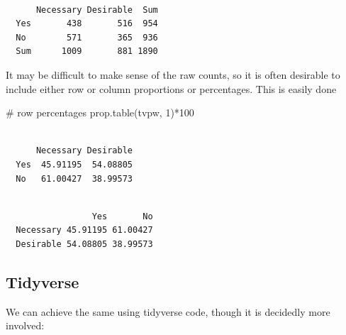 \documentclass[
  letterpaper,
  DIV=11,
  numbers=noendperiod]{scrreprt}
\newenvironment{Shaded}{\begin{snugshade}}{\end{snugshade}}
\newcommand{\CommentTok}[1]{\textcolor[rgb]{0.37,0.37,0.37}{#1}}
\newcommand{\DecValTok}[1]{\textcolor[rgb]{0.68,0.00,0.00}{#1}}
\newcommand{\FunctionTok}[1]{\textcolor[rgb]{0.28,0.35,0.67}{#1}}
\newcommand{\NormalTok}[1]{\textcolor[rgb]{0.00,0.23,0.31}{#1}}
\newcommand{\OtherTok}[1]{\textcolor[rgb]{0.00,0.23,0.31}{#1}}
\newcommand{\SpecialCharTok}[1]{\textcolor[rgb]{0.37,0.37,0.37}{#1}}
\begin{document}
\begin{verbatim}
     
      Necessary Desirable  Sum
  Yes       438       516  954
  No        571       365  936
  Sum      1009       881 1890
\end{verbatim}

It may be difficult to make sense of the raw counts, so it is often
desirable to include either row or column proportions or percentages.
This is easily done

\begin{Shaded}
\begin{Highlighting}[]
\CommentTok{\# row percentages}
\FunctionTok{prop.table}\NormalTok{(tvpw, }\DecValTok{1}\NormalTok{)}\SpecialCharTok{*}\DecValTok{100}
\end{Highlighting}
\end{Shaded}

\begin{verbatim}
     
      Necessary Desirable
  Yes  45.91195  54.08805
  No   61.00427  38.99573
\end{verbatim}

\begin{Shaded}
\end{Shaded}

\begin{verbatim}
           
                 Yes       No
  Necessary 45.91195 61.00427
  Desirable 54.08805 38.99573
\end{verbatim}

\subsection{Tidyverse}\label{tidyverse-1}

We can achieve the same using tidyverse code, though it is decidedly
more involved:
\end{document}
